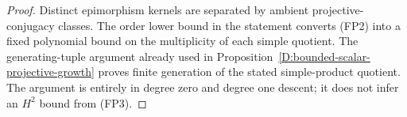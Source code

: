 \begin{proof}
Distinct epimorphism kernels are separated by ambient
projective-conjugacy classes.  The order lower bound in the
statement converts (FP2) into a fixed polynomial bound on
the multiplicity of each simple quotient.
The generating-tuple argument already used in
Proposition~\ref{D:bounded-scalar-projective-growth} proves
finite generation of the stated simple-product quotient.
The argument is entirely in degree zero and degree one
descent; it does not infer an \(H^2\) bound from (FP3).
\end{proof}
